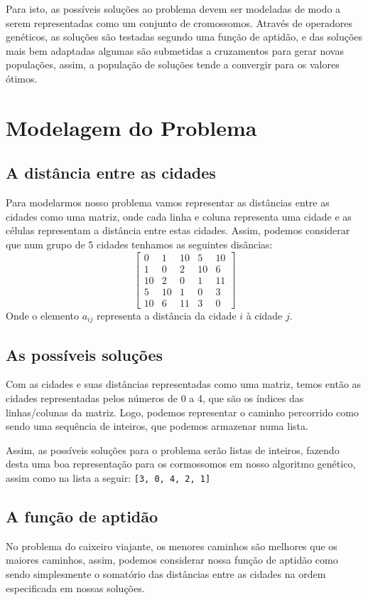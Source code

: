 \documentclass[a4paper,12pt]{article}
\begin{document}
  Para isto, as possíveis soluções ao problema devem ser modeladas de modo a
  serem representadas como um conjunto de cromossomos. Através de operadores
  genéticos, as soluções são testadas segundo uma função de aptidão, e
  das soluções mais bem adaptadas algumas são submetidas a cruzamentos para
  gerar novas populações, assim, a população de soluções tende a convergir para
  os valores ótimos.

  \section{Modelagem do Problema}
  \subsection{A distância entre as cidades}
  Para modelarmos nosso problema vamos representar as distâncias entre as
  cidades como uma matriz, onde cada linha e coluna representa uma cidade e as
  células representam a distância entre estas cidades. Assim, podemos considerar
  que num grupo de 5 cidades tenhamos as seguintes disâncias:
  \begin{displaymath}
    \begin{bmatrix}
      0 & 1 & 10 & 5 & 10\\
      1 & 0 & 2 & 10 & 6\\
      10 & 2 & 0 & 1 & 11\\
      5 & 10 & 1 & 0 & 3\\
      10 & 6 & 11 & 3 & 0
    \end{bmatrix}
  \end{displaymath}
  Onde o elemento $a_{ij}$ representa a distância da cidade $i$ à cidade $j$.

  \subsection{As possíveis soluções}
  Com as cidades e suas distâncias representadas como uma matriz, temos então as
  cidades representadas pelos números de 0 a 4, que são os índices das
  linhas/colunas da matriz.
  Logo, podemos representar o caminho percorrido como sendo uma sequência de
  inteiros, que podemos armazenar numa lista.

  Assim, as possíveis soluções para o problema serão listas de inteiros, fazendo
  desta uma boa representação para os cormossomos em nosso algoritmo genético,
  assim como na lista a seguir: \verb+[3, 0, 4, 2, 1]+

  \subsection{A função de aptidão}
  No problema do caixeiro viajante, os menores caminhos são melhores que os
  maiores caminhos, assim, podemos considerar nossa função de aptidão como sendo
  simplesmente o somatório das distâncias entre as cidades na ordem especificada
  em nossas soluções.
\end{document}
